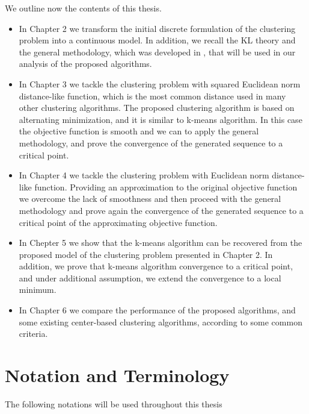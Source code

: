 We outline now the contents of this thesis.
\begin{itemize}
	\item In Chapter 2 we transform the initial discrete formulation  of the clustering problem into a continuous model. In addition, we recall the KL theory and the general methodology, which was developed in \cite{BST2014}, that will be used in our analysis of the proposed algorithms.
	\item In Chapter 3 we tackle the clustering problem with squared Euclidean norm distance-like function, which is the most common distance used in many other clustering algorithms. The proposed clustering algorithm is based on alternating minimization, and it is similar to k-means algorithm. In this case the objective function is smooth and we can to apply the general methodology, and prove the convergence of the generated sequence to a critical point.
	\item In Chapter 4 we tackle the clustering problem with Euclidean norm distance-like function. Providing an approximation to the original objective function we overcome the lack of smoothness and then proceed with the general methodology and prove again the convergence of the generated sequence to a critical point of the approximating objective function.
	\item In Chepter 5 we show that the k-means algorithm can be recovered from the proposed model of the clustering problem presented in Chapter 2. In addition, we prove that k-means algorithm convergence to a critical point, and under additional assumption, we extend the convergence to a local minimum.
	\item In Chapter 6 we compare the performance of the proposed algorithms, and some existing center-based clustering algorithms, according to some common criteria.
\end{itemize}

\clearpage
\section{Notation and Terminology}

The following notations will be used throughout this thesis

